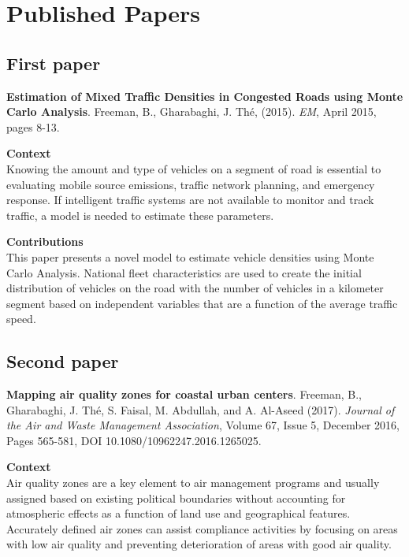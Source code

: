 
\chapter{Published Papers}

\section{First paper}
\textbf{Estimation of Mixed Traffic Densities in Congested Roads using Monte Carlo Analysis}. Freeman, B., Gharabaghi, J.  Th\'e, (2015). \textit{EM}, April 2015, pages 8-13. 

\vspace{5mm}
\noindent
\textbf{Context}\\
\noindent
Knowing the amount and type of vehicles on a segment of road is essential to evaluating mobile source emissions, traffic network planning, and emergency response. If intelligent traffic systems are not available to monitor and track traffic, a model is needed to estimate these parameters.

\vspace{5mm}
\noindent
\textbf{Contributions}\\
\noindent
This paper presents a novel model to estimate vehicle densities using Monte Carlo Analysis. National fleet characteristics are used to create the initial distribution of vehicles on the road with the number of vehicles in a kilometer segment based on independent variables that are a function of the average traffic speed. 

\noindent
\section{Second paper}

\textbf{Mapping air quality zones for coastal urban centers}. Freeman, B., Gharabaghi, J.  Th\'e, S. Faisal, M. Abdullah, and A. Al-Aseed (2017). \textit{Journal of the Air and Waste Management Association}, Volume 67, Issue 5, December 2016, Pages 565-581, DOI 10.1080/10962247.2016.1265025.

\vspace{5mm}
\noindent
\textbf{Context}\\
\noindent
Air quality zones are a key element to air management programs and usually assigned based on existing political boundaries without accounting for atmospheric effects as a function of land use and geographical features. Accurately defined air zones can assist compliance activities by focusing on areas with low air quality and preventing deterioration of areas with good air quality.

